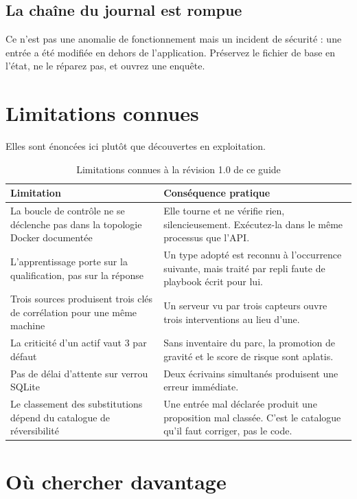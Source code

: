 \subsection{La chaîne du journal est rompue}

Ce n'est pas une anomalie de fonctionnement mais un incident de sécurité :
une entrée a été modifiée en dehors de l'application. Préservez le fichier de
base en l'état, ne le réparez pas, et ouvrez une enquête.

\section{Limitations connues}

Elles sont énoncées ici plutôt que découvertes en exploitation.

\begin{table}[h]
\centering
\begin{tabular}{@{}p{5.6cm}p{8.4cm}@{}}
\toprule
\textbf{Limitation} & \textbf{Conséquence pratique} \\
\midrule
La boucle de contrôle ne se déclenche pas dans la topologie Docker documentée &
Elle tourne et ne vérifie rien, silencieusement. Exécutez-la dans le même
processus que l'API. \\[8pt]
L'apprentissage porte sur la qualification, pas sur la réponse &
Un type adopté est reconnu à l'occurrence suivante, mais traité par repli
faute de playbook écrit pour lui. \\[8pt]
Trois sources produisent trois clés de corrélation pour une même machine &
Un serveur vu par trois capteurs ouvre trois interventions au lieu d'une. \\[8pt]
La criticité d'un actif vaut 3 par défaut &
Sans inventaire du parc, la promotion de gravité et le score de risque sont
aplatis. \\[8pt]
Pas de délai d'attente sur verrou SQLite &
Deux écrivains simultanés produisent une erreur immédiate. \\[8pt]
Le classement des substitutions dépend du catalogue de réversibilité &
Une entrée mal déclarée produit une proposition mal classée. C'est le catalogue
qu'il faut corriger, pas le code. \\
\bottomrule
\end{tabular}
\caption{Limitations connues à la révision 1.0 de ce guide}
\end{table}

\section{Où chercher davantage}

